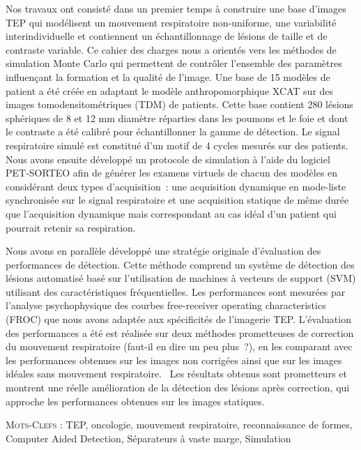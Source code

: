 Nos travaux ont consisté dans un premier temps à construire une base d’images TEP qui modélisent un mouvement respiratoire non-uniforme, une variabilité interindividuelle et contiennent un échantillonnage de lésions de taille et de contraste variable. Ce cahier des charges nous a orientés vers les méthodes de simulation Monte Carlo qui permettent de contrôler l’ensemble des paramètres influençant la formation et la qualité de l’image. Une base de 15 modèles de patient a été créée en adaptant le modèle anthropomorphique XCAT sur des images tomodensitométriques (TDM) de patients. Cette base contient 280 lésions sphériques de 8 et 12 mm diamètre réparties dans les poumons et le foie et dont le contraste a été calibré pour échantillonner la gamme de détection. Le signal respiratoire simulé est constitué d’un motif de 4 cycles mesurés sur des patients. Nous avons ensuite développé un protocole de simulation à l’aide du logiciel PET-SORTEO afin de générer les examens virtuels de chacun des modèles en considérant deux types d’acquisition : une acquisition dynamique en mode-liste synchronisée sur le signal respiratoire et une acquisition statique de même durée que l’acquisition dynamique mais correspondant au cas idéal d’un patient qui pourrait retenir sa respiration.

Nous avons en parallèle développé une stratégie originale d’évaluation des performances de détection. Cette méthode comprend un système de détection des lésions automatisé basé sur l'utilisation de machines à vecteurs de support (SVM) utilisant des caractéristiques fréquentielles. Les performances sont mesurées par l’analyse psychophysique des courbes free-receiver operating characteristics (FROC) que nous avons adaptée aux spécificités de l’imagerie TEP. L’évaluation des performances a été est réalisée sur deux méthodes prometteuses de correction du mouvement respiratoire (faut-il en dire un peu plus ?), en les comparant avec les performances obtenues sur les images non corrigées ainsi que sur les images idéales sans mouvement respiratoire. 
Les résultats obtenus sont prometteurs et montrent une réelle amélioration de la détection des lésions après correction, qui approche les performances obtenues sur les images statiques. 

\textsc{Mots-Clefs :} TEP, oncologie, mouvement respiratoire, reconnaissance de formes, Computer Aided Detection, Séparateurs à vaste marge, Simulation